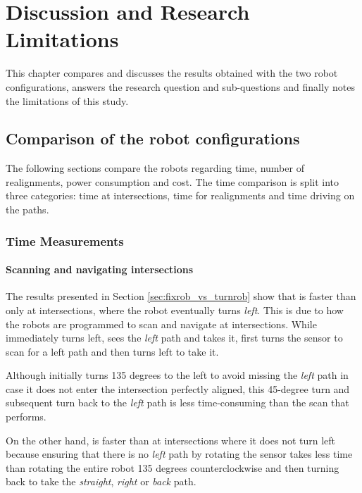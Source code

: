\section{Discussion and Research Limitations} \label{sec:discussion}
This chapter compares and discusses the results obtained with the two robot configurations, answers the research question and sub-questions and finally notes the limitations of this study.

\subsection{Comparison of the robot configurations}

The following sections compare the robots regarding time, number of realignments, power consumption and cost. The time comparison is split into three categories: time at intersections, time for realignments and time driving on the paths.

\subsubsection{Time Measurements}\label{sec:time_measurements}

\paragraph{Scanning and navigating intersections}\label{sec:discussion_intersections}

The results presented in Section \ref{sec:fixrob_vs_turnrob} show that \FixRob is faster than \TurnRob only at intersections, where the robot eventually turns \textit{left}. This is due to how the robots are programmed to scan and navigate at intersections. While \FixRob immediately turns left, sees the \textit{left} path and takes it, \TurnRob first turns the sensor to scan for a left path and then turns left to take it. 

Although \FixRob initially turns 135 degrees to the left to avoid missing the \textit{left} path in case it does not enter the intersection perfectly aligned, this 45-degree turn and subsequent turn back to the \textit{left} path is less time-consuming than the scan that \TurnRob performs. 

On the other hand, \TurnRob is faster than \FixRob at intersections where it does not turn left because ensuring that there is no \textit{left} path by rotating the sensor takes less time than rotating the entire robot 135 degrees counterclockwise and then turning back to take the \textit{straight}, \textit{right} or \textit{back} path.

